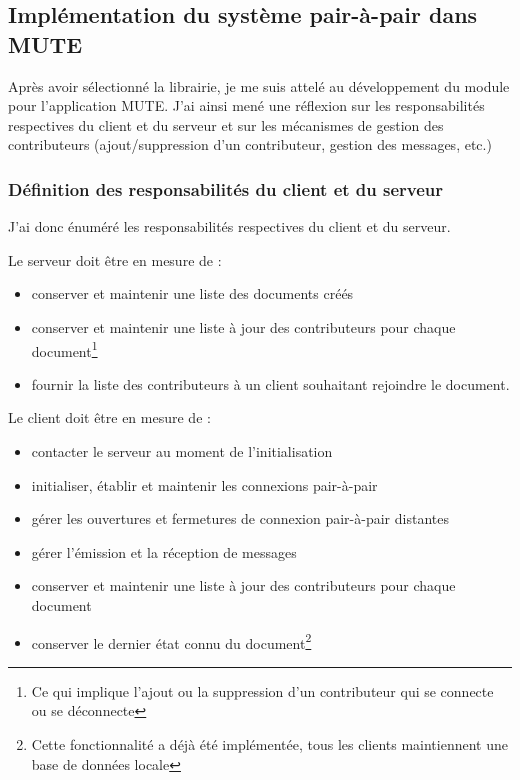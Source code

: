 \documentclass{tnreport}
\begin{document}
\subsection{Implémentation du système pair-à-pair dans MUTE}

Après avoir sélectionné la librairie, je me suis attelé au développement du module pour l'application MUTE. J'ai ainsi mené une réflexion sur les responsabilités respectives du client et du serveur et sur les mécanismes de gestion des contributeurs (ajout/suppression d'un contributeur, gestion des messages, etc.)

\subsubsection{Définition des responsabilités du client et du serveur}
J'ai donc énuméré les responsabilités respectives du client et du serveur.

Le serveur doit être en mesure de :
\begin{itemize}
  \item conserver et maintenir une liste des documents créés
  \item conserver et maintenir une liste à jour des contributeurs pour chaque document\footnote{Ce qui implique l'ajout ou la suppression d'un contributeur qui se connecte ou se déconnecte}
  \item fournir la liste des contributeurs à un client souhaitant rejoindre le document.\\
\end{itemize}

Le client doit être en mesure de :
\begin{itemize}
  \item contacter le serveur au moment de l'initialisation
  \item initialiser, établir et maintenir les connexions pair-à-pair
  \item gérer les ouvertures et fermetures de connexion pair-à-pair distantes
  \item gérer l'émission et la réception de messages
  \item conserver et maintenir une liste à jour des contributeurs pour chaque document
  \item conserver le dernier état connu du document\footnote{Cette fonctionnalité a déjà été implémentée, tous les clients maintiennent une base de données locale}\\
\end{itemize}
\end{document}
